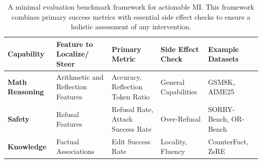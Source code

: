 \begin{table}[ht!]
    \centering
    \caption{A minimal evaluation benchmark framework for actionable MI. This framework combines primary success metrics with essential side effect checks to ensure a holistic assessment of any intervention.}
    \label{tab:evaluation_framework}
    \small
    \renewcommand{\arraystretch}{1.3} 
    \begin{tabularx}{\textwidth}{
      >{\raggedright\arraybackslash}p{} 
      >{\raggedright\arraybackslash}X                 
      >{\raggedright\arraybackslash}X 
      >{\raggedright\arraybackslash}X 
      >{\raggedright\arraybackslash}X 
    }
    \toprule
    \textbf{Capability} & \textbf{Feature to Localize/ Steer} & \textbf{Primary Metric} & \textbf{Side Effect Check} & \textbf{Example Datasets} \\
    \midrule
    \textbf{Math Reasoning} & Arithmetic and Reflection Features & Accuracy, Reflection Token Ratio & General Capabilities & GSM8K, AIME25 \\
    \addlinespace 
    \textbf{Safety} & Refusal Features & Refusal Rate, Attack Success Rate & Over-Refusal & SORRY-Bench, OR-Bench \\
    \addlinespace
    \textbf{Knowledge} & Factual Associations & Edit Success Rate & Locality, Fluency & CounterFact, ZsRE \\
    \bottomrule
    \end{tabularx}
    \end{table}